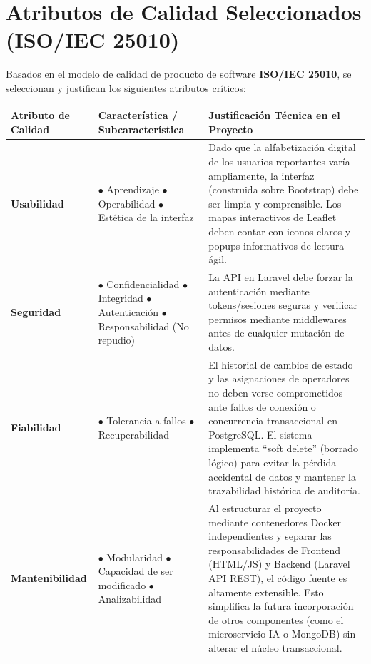\section{Atributos de Calidad Seleccionados (ISO/IEC 25010)}

Basados en el modelo de calidad de producto de software \textbf{ISO/IEC 25010}, se seleccionan y justifican los siguientes atributos críticos:

\begin{table}[H]
\centering
\small
\begin{tabularx}{\textwidth}{p{3.0cm} p{4.2cm} X}
\toprule
\textbf{Atributo de Calidad} & \textbf{Característica / Subcaracterística} & \textbf{Justificación Técnica en el Proyecto} \\
\midrule
\textbf{Usabilidad} & 
$\bullet$ Aprendizaje \newline 
$\bullet$ Operabilidad \newline 
$\bullet$ Estética de la interfaz & 
Dado que la alfabetización digital de los usuarios reportantes varía ampliamente, la interfaz (construida sobre Bootstrap) debe ser limpia y comprensible. Los mapas interactivos de Leaflet deben contar con iconos claros y popups informativos de lectura ágil. \\
\midrule
\textbf{Seguridad} & 
$\bullet$ Confidencialidad \newline 
$\bullet$ Integridad \newline 
$\bullet$ Autenticación \newline 
$\bullet$ Responsabilidad (No repudio) & 
La API en Laravel debe forzar la autenticación mediante tokens/sesiones seguras y verificar permisos mediante middlewares antes de cualquier mutación de datos. \\
\midrule
\textbf{Fiabilidad} & 
$\bullet$ Tolerancia a fallos \newline 
$\bullet$ Recuperabilidad & 
El historial de cambios de estado y las asignaciones de operadores no deben verse comprometidos ante fallos de conexión o concurrencia transaccional en PostgreSQL. El sistema implementa ``soft delete'' (borrado lógico) para evitar la pérdida accidental de datos y mantener la trazabilidad histórica de auditoría. \\
\midrule
\textbf{Mantenibilidad} & 
$\bullet$ Modularidad \newline 
$\bullet$ Capacidad de ser modificado \newline 
$\bullet$ Analizabilidad & 
Al estructurar el proyecto mediante contenedores Docker independientes y separar las responsabilidades de Frontend (HTML/JS) y Backend (Laravel API REST), el código fuente es altamente extensible. Esto simplifica la futura incorporación de otros componentes (como el microservicio IA o MongoDB) sin alterar el núcleo transaccional. \\

\end{tabularx}
\end{table}
